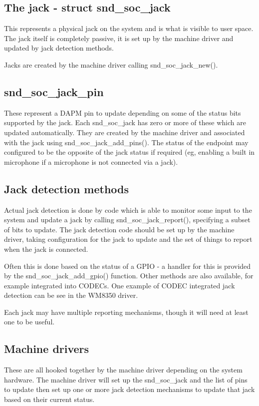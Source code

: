 \documentclass[a4paper,8pt,english]{sphinxmanual}
\begin{document}
\subsection{The jack - struct snd\_soc\_jack}
\label{sound/soc/jack:the-jack-struct-snd-soc-jack}
This represents a physical jack on the system and is what is visible to
user space.  The jack itself is completely passive, it is set up by the
machine driver and updated by jack detection methods.

Jacks are created by the machine driver calling snd\_soc\_jack\_new().


\subsection{snd\_soc\_jack\_pin}
\label{sound/soc/jack:snd-soc-jack-pin}
These represent a DAPM pin to update depending on some of the status
bits supported by the jack.  Each snd\_soc\_jack has zero or more of these
which are updated automatically.  They are created by the machine driver
and associated with the jack using snd\_soc\_jack\_add\_pins().  The status
of the endpoint may configured to be the opposite of the jack status if
required (eg, enabling a built in microphone if a microphone is not
connected via a jack).


\subsection{Jack detection methods}
\label{sound/soc/jack:jack-detection-methods}
Actual jack detection is done by code which is able to monitor some
input to the system and update a jack by calling snd\_soc\_jack\_report(),
specifying a subset of bits to update.  The jack detection code should
be set up by the machine driver, taking configuration for the jack to
update and the set of things to report when the jack is connected.

Often this is done based on the status of a GPIO - a handler for this is
provided by the snd\_soc\_jack\_add\_gpio() function.  Other methods are
also available, for example integrated into CODECs.  One example of
CODEC integrated jack detection can be see in the WM8350 driver.

Each jack may have multiple reporting mechanisms, though it will need at
least one to be useful.


\subsection{Machine drivers}
\label{sound/soc/jack:machine-drivers}
These are all hooked together by the machine driver depending on the
system hardware.  The machine driver will set up the snd\_soc\_jack and
the list of pins to update then set up one or more jack detection
mechanisms to update that jack based on their current status.
\end{document}
